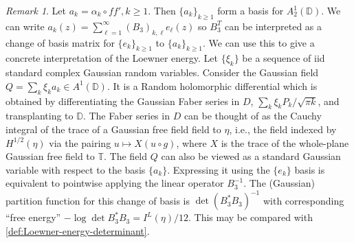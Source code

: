 \documentclass{article}
\numberwithin{equation}{section}
\numberwithin{figure}{section}
\theoremstyle{plain}
\theoremstyle{plain}
\numberwithin{thm}{section}
\theoremstyle{remark}
\newtheorem*{rem}{Remark}
\newcommand{\T}{\mathbb{T}}
\newcommand{\D}{\mathbb{D}}
\let \ge \geqslant
\begin{document}
\begin{rem}
Let $a_k = \alpha_k\circ f f', k\ge 1$. Then $\{a_k\}_{k \ge 1}$ form a basis for $A_2^1(\D)$. We can write  $a_k(z) = \sum_{\ell=1}^\infty (B_3)_{k,\ell} e_\ell(z)$ so $B_3^T$ can be interpreted as a change of basis matrix for $\{e_k\}_{k \ge 1}$ to $\{a_k\}_{k \ge 1}$. 
We can use this to give a concrete interpretation of the Loewner energy. Let $\{\xi_k\}$ be a sequence of iid standard complex Gaussian random variables. Consider the Gaussian field $Q=\sum_{k} \xi_k a_k \in A^1(\D)$. It is a Random holomorphic differential which is obtained by differentiating the Gaussian Faber series in $D$, $\sum_{k}\xi_k P_k/\sqrt{\pi k}$, and transplanting to $\D$. The Faber series in $D$ can be thought of as the Cauchy integral of the trace of a Gaussian free field field to $\eta$, i.e., the field indexed by $H^{1/2}(\eta)$ via the pairing $u \mapsto X( u\circ g)$, where $X$ is the trace of the whole-plane Gaussian free field to $\T$. The field $Q$ can also be viewed as a standard Gaussian variable with respect to the basis $\{a_k\}$. Expressing it using the $\{e_k\}$ basis is equivalent to pointwise applying the linear operator $B_3^{-1}$. The (Gaussian) partition function for this change of basis is $\det (B_3^*B_3)^{-1}$ with corresponding ``free energy'' $-\log \det B_3^*B_3 = I^L(\eta)/12$. This may be compared with \eqref{def:Loewner-energy-determinant}.
\end{rem}
\end{document}

